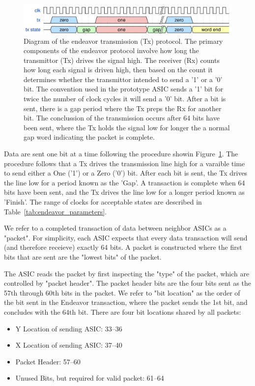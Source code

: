 \begin{figure}[]
\centering
\includegraphics[width=\textwidth]{images/endeavor_protocol.jpg}
\caption{Diagram of the endeavor transmission (Tx) protocol.
The primary components of the endeavor protocol involve how long the transmittor (Tx) drives the signal high.
The receiver (Rx) counts how long each signal is driven high, then based on the count it determines whether the transmittor intended to send a '1' or a '0' bit.
The convention used in the prototype ASIC sends a '1' bit for twice the number of clock cycles it will send a '0' bit.
After a bit is sent, there is a gap period where the Tx preps the Rx for another bit.
The conclussion of the transmission occurs after 64 bits have been sent, where the Tx holds the signal low for longer the a normal gap word indicating the packet is complete.
}
\label{fig:endeavor}
\end{figure}

Data are sent one bit at a time following the procedure showin Figure~\ref{fig:endeavor}. 
The procedure follows that a Tx drives the transmission line high for a varaible time to send either a One ('1') or a Zero ('0') bit.
After each bit is sent, the Tx drives the line low for a period known as the 'Gap'.
A transaction is complete when 64 bits have been sent, and the Tx drives the line low for a longer period known as 'Finish'.
The range of clocks for acceptable states are described in Table~\ref{tab:endeavor_parameters}.

We refer to a completed transaction of data between neighbor ASICs as a "packet".
For simplicity, each ASIC expects that every data transaction will send (and therefore receieve) exactly 64 bits.
A packet is constructed where the first bits that are sent are the "lowest bits" of the packet.

The ASIC reads the packet by first inspecting the "type" of the packet, which are controlled by "packet header".
The packet header bits are the four bits sent as the 57th through 60th bits in the packet.
We refer to "bit location" as the order of the bit sent in the Endeavor transaction, where the packet sends the 1st bit, and concludes with the 64th bit.
There are four bit locations shared by all packets:

\begin{itemize}
    \item Y Location of sending ASIC: 33--36
    \item X Location of sending ASIC: 37--40
    \item Packet Header: 57--60
    \item Unused Bits, but required for valid packet: 61--64
\label{bit_reservation}
\end{itemize}

